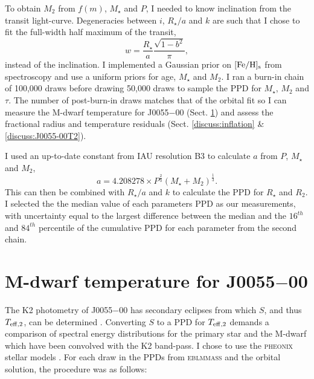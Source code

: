 To obtain $M_2$ from $f(m)$, $M_{\star}$ and $P$, I needed to know inclination from the transit light-curve. Degeneracies between $i$, $R_{\star}/a$ and $k$ are such that I chose to fit the full-width half maximum of the transit,
%
\begin{equation}\label{fwhm_transit}
w = \frac{R_{\star}}{a} \frac{\sqrt{1-b^2}}{\pi} ,
\end{equation}
%
instead of the inclination. I implemented a Gaussian prior on $\rm [Fe/H]_s$ from spectroscopy and use a uniform priors for age, $M_{\star}$ and $M_2$. I ran a burn-in chain of 100,000 draws before drawing 50,000 draws to sample the PPD for $M_{\star}$, $M_2$ and $\tau$. The number of post-burn-in draws matches that of the orbital fit so I can measure the M-dwarf temperature for J0055$-$00 (Sect. \ref{method:M_dwarf_temp}) and assess the fractional radius and temperature residuals (Sect. \ref{discuss:inflation} \& \ref{discuss:J0055-00T2}).


I used an up-to-date constant from IAU resolution B3 \citep{2016AJ....152...41P} to calculate $a$ from $P$, $M_{\star}$ and $M_2$,
%
\begin{equation}
a = 4.208278 \times P^{\frac{2}{3}} (M_{\star} + M_2)^{\frac{1}{3}}.
\end{equation}
%
This can then be combined with $R_{\star}/a$ and $k$ to calculate the PPD for $R_{\star}$ and $R_2$. I selected the the median value of each parameters PPD as our measurements, with uncertainty equal to the largest difference between the median and the $16^{th}$ and $84^{th}$ percentile of the cumulative PPD for each parameter from the second chain.




\section{M-dwarf temperature for J0055$-$00}\label{method:M_dwarf_temp}

The K2 photometry of J0055$-$00 has secondary eclipses from which $S$, and thus $T_{\rm eff, 2}$, can be determined . Converting $S$ to a PPD for $T_{\rm eff, 2}$ demands a comparison of spectral energy distributions for the primary star and the M-dwarf which have been convolved with the K2 band-pass. I chose to use the \textsc{pheonix} stellar models \citep{2013A&A...553A...6H}.  For each draw in the PPDs from \textsc{eblmmass} and the orbital solution, the procedure was as follows:

